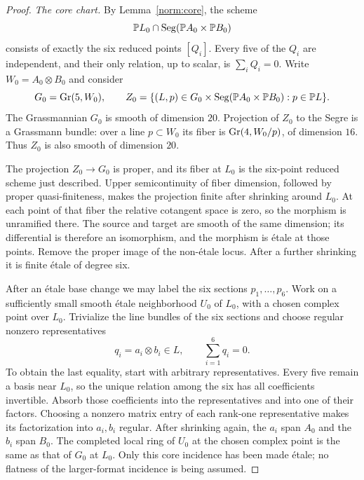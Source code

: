 \begin{proof}
\emph{The core chart.}
By Lemma~\ref{norm:core}, the scheme
\[
 \mathbb P L_0\cap\operatorname{Seg}(\mathbb P A_0\times\mathbb P B_0)
\]
consists of exactly the six reduced points $[Q_i]$. Every five of the
$Q_i$ are independent, and their only relation, up to scalar, is
$\sum_iQ_i=0$.
Write $W_0=A_0\otimes B_0$ and consider
\[
 G_0=\operatorname{Gr}(5,W_0),\qquad
 Z_0=\{(L,p)\in G_0\times\operatorname{Seg}(\mathbb P A_0\times\mathbb P B_0):
                         p\in\mathbb P L\}.
\]
The Grassmannian $G_0$ is smooth of dimension $20$.
Projection of $Z_0$ to the Segre is a Grassmann bundle: over a line
$p\subset W_0$ its fiber is $\operatorname{Gr}(4,W_0/p)$, of dimension $16$.
Thus $Z_0$ is also smooth of dimension $20$.

The projection $Z_0\to G_0$ is proper, and its fiber at $L_0$ is the
six-point reduced scheme just described. Upper semicontinuity of fiber
dimension, followed by proper quasi-finiteness, makes the projection
finite after shrinking around $L_0$. At each point of that fiber the
relative cotangent space is zero, so the morphism is unramified there.
The source and target are smooth of the same dimension; its differential
is therefore an isomorphism, and the morphism is \'etale at those
points. Remove the proper image of the non-\'etale locus. After a further
shrinking it is finite \'etale of degree six.

After an \'etale base change we may label the six sections
$p_1,\ldots,p_6$. Work on a sufficiently small smooth \'etale
neighborhood $U_0$ of $L_0$, with a chosen complex point over $L_0$.
Trivialize the line bundles of the six sections and choose regular
nonzero representatives
\begin{equation}\label{nl:regular-representatives}
 q_i=a_i\otimes b_i\in L,\qquad \sum_{i=1}^6q_i=0.
\end{equation}
To obtain the last equality, start with arbitrary representatives.
Every five remain a basis near $L_0$, so the unique relation among the
six has all coefficients invertible. Absorb those coefficients into the
representatives and into one of their factors. Choosing a nonzero
matrix entry of each rank-one representative makes its factorization
into $a_i,b_i$ regular. After shrinking again, the $a_i$ span $A_0$
and the $b_i$ span $B_0$. The completed local ring of $U_0$ at the
chosen complex point is the same as that of $G_0$ at $L_0$.
Only this core incidence has been made \'etale; no flatness of the
larger-format incidence is being assumed.


\end{proof}

